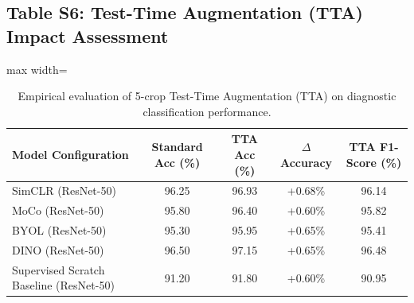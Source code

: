 \documentclass[11pt,a4paper]{article}
\begin{document}
\subsection*{Table S6: Test-Time Augmentation (TTA) Impact Assessment}
\begin{table}[htbp]
\centering
\caption{Empirical evaluation of 5-crop Test-Time Augmentation (TTA) on diagnostic classification performance.}
\label{tab:s6_tta}
\begin{adjustbox}{max width=\textwidth}
\begin{tabular}{l c c c c}
\toprule
\textbf{Model Configuration} & \textbf{Standard Acc (\%)} & \textbf{TTA Acc (\%)} & \textbf{$\Delta$ Accuracy} & \textbf{TTA F1-Score (\%)} \\
\midrule
SimCLR (ResNet-50) & 96.25 & 96.93 & +0.68\% & 96.14 \\
MoCo (ResNet-50)   & 95.80 & 96.40 & +0.60\% & 95.82 \\
BYOL (ResNet-50)   & 95.30 & 95.95 & +0.65\% & 95.41 \\
DINO (ResNet-50)   & 96.50 & 97.15 & +0.65\% & 96.48 \\
Supervised Scratch Baseline (ResNet-50) & 91.20 & 91.80 & +0.60\% & 90.95 \\
\bottomrule
\end{tabular}
\end{adjustbox}
\end{table}
\end{document}
